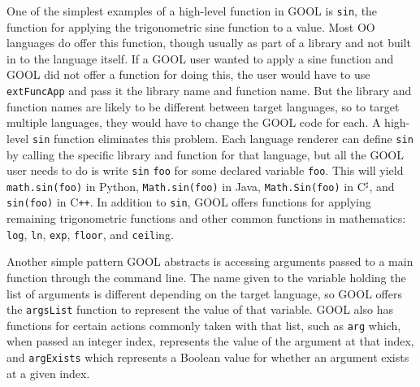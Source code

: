 \documentclass[sigplan,review,anonymous,prologue,dvipsnames]{acmart}
\newcommand{\Csharp}{C$^{\sharp}$}
\newcommand{\Cplusplus}{C\texttt{++}}
\begin{document}
One of the simplest examples of a high-level function in GOOL is \verb|sin|,
the function for applying the trigonometric sine function to a value. Most OO
languages do offer this function, though usually as part of a library and not
built in to the language itself. If a GOOL user wanted to apply a sine function
and GOOL did not offer a function for doing this, the user would have to use
\verb|extFuncApp| and pass it the library name and function name. But the
library and function names are likely to be different between target languages,
so to target multiple languages, they would have to change the GOOL
code for each. A high-level \verb|sin| function eliminates this problem. Each
language renderer can define \verb|sin| by calling the specific library and
function for that language, but all the GOOL user needs to do is write
\verb|sin| \verb|foo| for some declared variable \verb|foo|. This will
yield \verb|math.sin(foo)| in Python, \verb|Math.sin(foo)| in Java,
\verb|Math.Sin(foo)| in \Csharp, and \verb|sin(foo)| in \Cplusplus. In addition to
\verb|sin|, GOOL offers functions for applying remaining trigonometric
functions and other common functions in mathematics: \verb|log|, \verb|ln|,
\verb|exp|, \verb|floor|, and \verb|ceil|ing.

Another simple pattern GOOL abstracts is accessing arguments passed to a main
function through the command line. The name given to the variable holding the
list of arguments is different depending on the target language, so GOOL offers
the \verb|argsList| function to represent the value of that variable. GOOL
also has functions for certain actions commonly taken with that list, such as
\verb|arg| which, when passed an integer index, represents the value of the
argument at that index, and \verb|argExists| which represents a Boolean value
for whether an argument exists at a given index.
\end{document}
